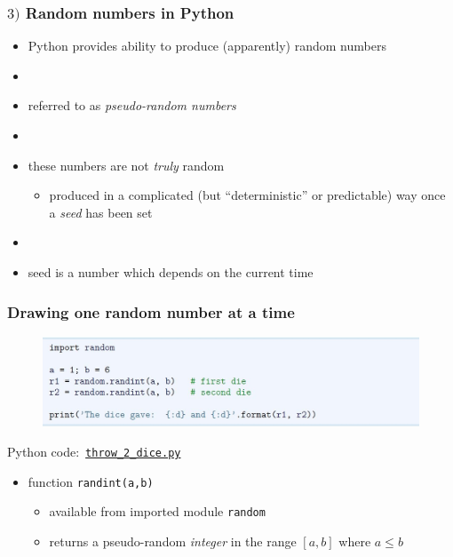 \documentclass[english,14pt]{beamer}
\newcommand\red[1]{{\color{red} #1}}
\begin{document}

\begin{frame}[fragile]

\frametitle{$3)$ Random numbers in Python}

\begin{itemize}
	\item Python provides ability to produce (apparently) random numbers
	\item[]
	\item referred to as \red{\emph{pseudo-random numbers}}
	\item[]
	\item these numbers are not \emph{truly} random
	\begin{itemize}
		\item produced in a complicated (but ``deterministic'' or predictable) way once a \red{\emph{seed}} has been set
	\end{itemize}	
	\item[]
	\item seed is a number which depends on the current time
		
\end{itemize}

\end{frame}


\begin{frame}[fragile]

\frametitle{Drawing \textbf{one} random number at a time}

\begin{figure}[ht]
	\centering
	\includegraphics[width=\textwidth]{figures/LLp54}
\end{figure}

Python code:~\href{https://github.com/slgit/prog4comp_2/blob/master/py36-src/throw_2_dice.py}{\texttt{throw\_2\_dice.py}}

\begin{itemize}
	\item function \texttt{randint(a,b)}
	\begin{itemize}
		\item available from imported module \texttt{random} %
		\item returns a pseudo-random \emph{integer} in the range $[a,b]$ where $a \leq b$
	\end{itemize}
\end{itemize}

\end{frame}
\end{document}
